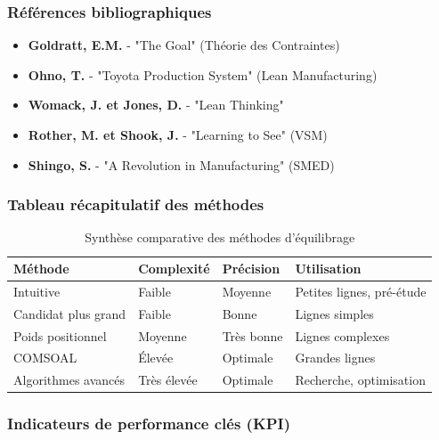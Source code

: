 \documentclass[12pt,a4paper]{article}
\begin{document}
\begin{center}
\subsubsection{Références bibliographiques}

\begin{itemize}
    \item \textbf{Goldratt, E.M.} - "The Goal" (Théorie des Contraintes)
    \item \textbf{Ohno, T.} - "Toyota Production System" (Lean Manufacturing)
    \item \textbf{Womack, J. et Jones, D.} - "Lean Thinking"
    \item \textbf{Rother, M. et Shook, J.} - "Learning to See" (VSM)
    \item \textbf{Shingo, S.} - "A Revolution in Manufacturing" (SMED)
\end{itemize}

\subsubsection{Tableau récapitulatif des méthodes}

\begin{table}[H]
\centering
\begin{tabular}{|p{3cm}|p{3cm}|p{3cm}|p{3cm}|}
\hline
\textbf{Méthode} & \textbf{Complexité} & \textbf{Précision} & \textbf{Utilisation} \\
\hline
Intuitive & Faible & Moyenne & Petites lignes, pré-étude \\
\hline
Candidat plus grand & Faible & Bonne & Lignes simples \\
\hline
Poids positionnel & Moyenne & Très bonne & Lignes complexes \\
\hline
COMSOAL & Élevée & Optimale & Grandes lignes \\
\hline
Algorithmes avancés & Très élevée & Optimale & Recherche, optimisation \\
\hline
\end{tabular}
\caption{Synthèse comparative des méthodes d'équilibrage}
\end{table}

\subsubsection{Indicateurs de performance clés (KPI)}


\end{center}
\end{document}
